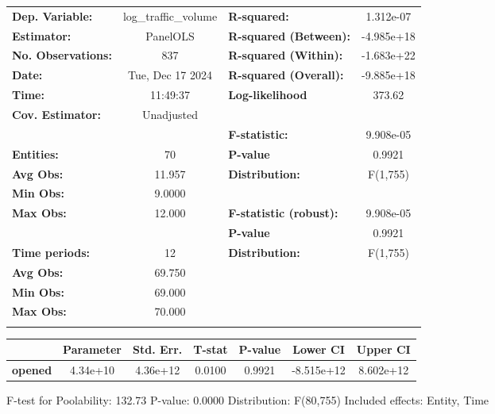 \begin{center}
\begin{tabular}{lclc}
\toprule
\textbf{Dep. Variable:}    & log\_traffic\_volume & \textbf{  R-squared:         }   &    1.312e-07     \\
\textbf{Estimator:}        &       PanelOLS       & \textbf{  R-squared (Between):}  &    -4.985e+18    \\
\textbf{No. Observations:} &         837          & \textbf{  R-squared (Within):}   &    -1.683e+22    \\
\textbf{Date:}             &   Tue, Dec 17 2024   & \textbf{  R-squared (Overall):}  &    -9.885e+18    \\
\textbf{Time:}             &       11:49:37       & \textbf{  Log-likelihood     }   &      373.62      \\
\textbf{Cov. Estimator:}   &      Unadjusted      & \textbf{                     }   &                  \\
\textbf{}                  &                      & \textbf{  F-statistic:       }   &    9.908e-05     \\
\textbf{Entities:}         &          70          & \textbf{  P-value            }   &      0.9921      \\
\textbf{Avg Obs:}          &        11.957        & \textbf{  Distribution:      }   &     F(1,755)     \\
\textbf{Min Obs:}          &        9.0000        & \textbf{                     }   &                  \\
\textbf{Max Obs:}          &        12.000        & \textbf{  F-statistic (robust):} &    9.908e-05     \\
\textbf{}                  &                      & \textbf{  P-value            }   &      0.9921      \\
\textbf{Time periods:}     &          12          & \textbf{  Distribution:      }   &     F(1,755)     \\
\textbf{Avg Obs:}          &        69.750        & \textbf{                     }   &                  \\
\textbf{Min Obs:}          &        69.000        & \textbf{                     }   &                  \\
\textbf{Max Obs:}          &        70.000        & \textbf{                     }   &                  \\
\textbf{}                  &                      & \textbf{                     }   &                  \\
\bottomrule
\end{tabular}
\begin{tabular}{lcccccc}
                & \textbf{Parameter} & \textbf{Std. Err.} & \textbf{T-stat} & \textbf{P-value} & \textbf{Lower CI} & \textbf{Upper CI}  \\
\midrule
\textbf{opened} &      4.34e+10      &      4.36e+12      &      0.0100     &      0.9921      &     -8.515e+12    &     8.602e+12      \\
\bottomrule
\end{tabular}
\end{center}

F-test for Poolability: 132.73 \newline
 P-value: 0.0000 \newline
 Distribution: F(80,755) \newline
  \newline
 Included effects: Entity, Time